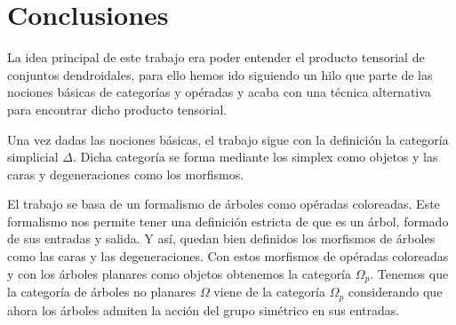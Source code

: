 \documentclass[11pt,a4paper,openright,oneside]{article}
\numberwithin{equation}{section}
\theoremstyle{definition}
\begin{document}


\setcounter{page}{1}



\newpage


\newpage


\newpage


\newpage
\section{Conclusiones}

La idea principal de este trabajo era poder entender el producto tensorial de conjuntos dendroidales, para ello hemos ido siguiendo un hilo que parte de las nociones b\'asicas de categor\'ias y op\'eradas y acaba con una t\'ecnica alternativa para encontrar dicho producto tensorial.

Una vez dadas las nociones b\'asicas, el trabajo sigue con la definici\'on la categor\'ia simplicial $\Delta$. Dicha categor\'ia se forma mediante los simplex como objetos y las caras y degeneraciones como los morfismos.

El trabajo se basa de un formalismo de \'arboles como op\'eradas coloreadas. Este formalismo nos permite tener una definici\'on estricta de que es un \'arbol, formado de sus entradas y salida.
Y as\'i, quedan bien definidos los morfismos de \'arboles como las caras y las degeneraciones. Con estos morfismos de op\'eradas coloreadas y con los \'arboles planares como objetos obtenemos la categor\'ia $\Omega_p$.
Tenemos que la categor\'ia de \'arboles no planares $\Omega$ viene de la categor\'ia $\Omega_p$ considerando que ahora los \'arboles admiten la acci\'on del grupo sim\'etrico en sus entradas.
\end{document}
